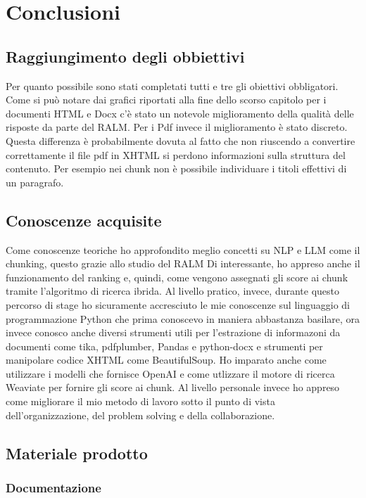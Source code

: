 \chapter{Conclusioni}
\label{cap:conclusioni}

\section{Raggiungimento degli obbiettivi}
Per quanto possibile sono stati completati tutti e tre gli obiettivi obbligatori.
Come si può notare dai grafici riportati alla fine dello scorso capitolo per i documenti HTML e Docx c'è stato un notevole miglioramento della qualità delle risposte da parte del RALM.
Per i Pdf invece il miglioramento è stato discreto.
Questa differenza è probabilmente dovuta al fatto che non riuscendo a convertire correttamente il file pdf in XHTML si perdono informazioni sulla struttura del contenuto.
Per esempio nei chunk non è possibile individuare i titoli effettivi di un paragrafo.

\section{Conoscenze acquisite}
Come conoscenze teoriche ho approfondito meglio concetti su NLP e LLM come il chunking, questo grazie allo studio del RALM
Di interessante, ho appreso anche il funzionamento del ranking e, quindi, come vengono assegnati gli score ai chunk tramite l'algoritmo di ricerca ibrida.
Al livello pratico, invece, durante questo percorso di stage ho sicuramente accresciuto le mie conoscenze sul linguaggio di programmazione Python che prima conoscevo in maniera abbastanza basilare, ora invece conosco anche diversi strumenti utili per l'estrazione di informazoni da documenti come tika, pdfplumber, Pandas e python-docx e strumenti per manipolare codice XHTML come BeautifulSoup.
Ho imparato anche come utilizzare i modelli che fornisce OpenAI e come utlizzare il motore di ricerca Weaviate per fornire gli score ai chunk.
Al livello personale invece ho appreso come migliorare il mio metodo di lavoro sotto il punto di vista dell'organizzazione, del problem solving e della collaborazione.

\section{Materiale prodotto}
\subsection{Documentazione}

